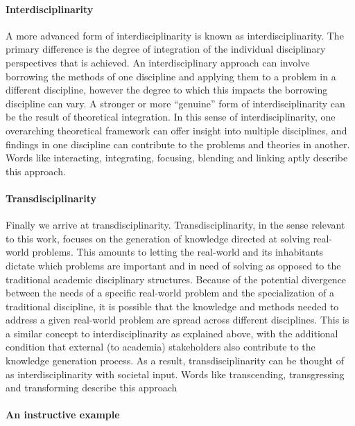 \documentclass[a4paper]{article}
\begin{document}
\paragraph{Interdisciplinarity}

A more advanced form of interdisciplinarity is known as interdisciplinarity.
The primary difference is the degree of integration of the individual
disciplinary perspectives that is achieved. An interdisciplinary approach can
involve borrowing the methods of one discipline and applying them to a problem
in a different discipline, however the degree to which this impacts the
borrowing discipline can vary. A stronger or more ``genuine'' form of
interdisciplinarity can be the result of theoretical integration. In this
sense of interdisciplinarity, one overarching theoretical framework can offer
insight into multiple disciplines, and findings in one discipline can
contribute to the problems and theories in another. Words like interacting,
integrating, focusing, blending and linking aptly describe this approach.

\paragraph{Transdisciplinarity}

Finally we arrive at transdisciplinarity. Transdisciplinarity, in the sense
relevant to this work, focuses on the generation of knowledge directed at
solving real-world problems. This amounts to letting the real-world and its
inhabitants dictate which problems are important and in need of solving as
opposed to the traditional academic disciplinary structures. Because of the
potential divergence between the needs of a specific real-world problem and
the specialization of a traditional discipline, it is possible that the
knowledge and methods needed to address a given real-world problem are spread
across different disciplines. This is a similar concept to
interdisciplinarity as explained above, with the additional condition that
external (to academia) stakeholders also contribute to the knowledge
generation process. As a result, transdisciplinarity can be thought of as
interdisciplinarity with societal input. Words like transcending,
transgressing and transforming describe this approach

\paragraph{An instructive example}
\end{document}
